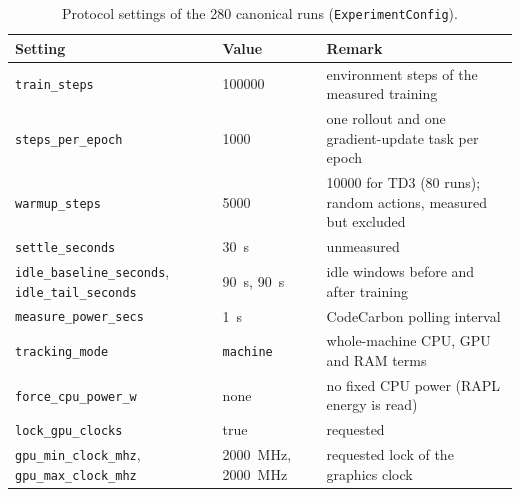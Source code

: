 \begin{table}[tbp]
  \centering
  \footnotesize
  \caption{Protocol settings of the \num{280} canonical runs (\texttt{ExperimentConfig}).}
  \label{tab:app-hp-protocol}
  \begin{tabular}{@{}p{4.7cm}p{3.7cm}p{5.0cm}@{}}
    \toprule
    Setting                                                              & Value                          & Remark                                                   \\
    \midrule
    \texttt{train\_steps}                                                & \num{100000}                   & environment steps of the measured training              \\
    \texttt{steps\_per\_epoch}                                           & \num{1000}                     & one rollout and one gradient-update task per epoch      \\
    \texttt{warmup\_steps}                                               & \num{5000}                     & \num{10000} for TD3 (\num{80} runs); random actions, measured but excluded \\
    \texttt{settle\_seconds}                                             & \SI{30}{\second}               & unmeasured                                               \\
    \texttt{idle\_baseline\_seconds}, \texttt{idle\_tail\_seconds}       & \SI{90}{\second}, \SI{90}{\second} & idle windows before and after training               \\
    \texttt{measure\_power\_secs}                                        & \SI{1}{\second}                & CodeCarbon polling interval                             \\
    \texttt{tracking\_mode}                                              & \texttt{machine}               & whole-machine CPU, GPU and RAM terms                     \\
    \texttt{force\_cpu\_power\_w}                                        & none                           & no fixed CPU power (RAPL energy is read)                \\
    \texttt{lock\_gpu\_clocks}                                           & true                           & requested                                                \\
    \texttt{gpu\_min\_clock\_mhz}, \texttt{gpu\_max\_clock\_mhz}         & \SI{2000}{\mega\hertz}, \SI{2000}{\mega\hertz} & requested lock of the graphics clock               \\

\end{tabular}
\end{table}
